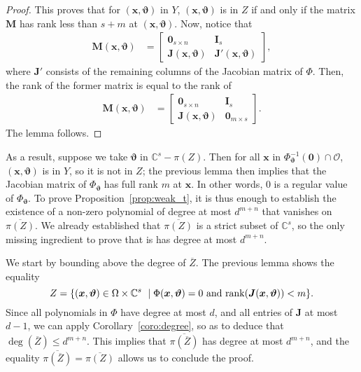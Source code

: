 \documentclass[12pt]{article}
\def\sO{\mathscr{O}}
\def\thetab{\bm{\vartheta}}
\def\xb{{\bm x}}
\def\dt{s}
\def\C{\mathbb{C}}
\def\bbm{\begin{bmatrix}}
\def\ebm{\end{bmatrix}}
\begin{document}
\begin{proof}
  This proves that for $(\xb,\thetab)$ in $Y$, $(\xb,\thetab)$ is in
  $Z$ if and only if the matrix $\bm M$ has rank less than $\dt+m$ at
  $(\xb,\thetab)$. Now, notice that
  \begin{align*}
   \bm M(\xb,\thetab)&= 
    \bbm 
    \textbf{0}_{\dt \times n} &\textbf{I}_{\dt} \\
    \bm J(\xb,\thetab)     &\bm J'(\xb,\thetab)
    \ebm,
  \end{align*}
  where $\bm J'$ consists of the remaining columns of the Jacobian matrix of
  $\Phi$.  Then, the rank of the former matrix is equal to the rank
  of
  \begin{align*}
   \bm M(\xb,\thetab)&= 
    \bbm 
    \textbf{0}_{\dt \times n} &\textbf{I}_{\dt} \\
    \bm J(\xb,\thetab)     & \bm 0_{m \times s}
    \ebm.
  \end{align*}
  The lemma follows.
\end{proof}

As a result, suppose we take $\thetab$ in $\C^\dt - {\pi(Z)}$.  Then
for all $\xb$ in $\Phi_{\thetab}^{-1}(\bm 0) \cap \sO$,
$(\xb,\thetab)$ is in $Y$, so it is not in $Z$; the previous lemma
then implies that the Jacobian matrix of $\Phi_{\thetab}$ has full
rank $m$ at $\xb$. In other words, $0$ is a regular value of
$\Phi_{\thetab}$. To prove Proposition~\ref{prop:weak_t}, it is thus
enough to establish the existence of a non-zero polynomial of degree
at most $d^{m+n}$ that vanishes on $\overline{\pi(Z)}$. We already
established that $\overline{\pi(Z)}$ is a strict subset of $\C^\dt$,
so the only missing ingredient to prove that is has degree
at most $d^{m+n}$.

We start by bounding above the degree of $\overline{Z}$.
The previous lemma shows the equality
\[Z = \{ (\xb,\thetab) \in \Omega \times \C^\dt \ \mid \Phi(\xb,\thetab) =0
\text{~and~} {\rm rank}(\bm J(\xb,\thetab)) < m\}.\] Since all
polynomials in $\Phi$ have degree at most $d$, and all entries of $\bm
J$ at most $d-1$, we can apply Corollary~\ref{coro:degree}, so as to
deduce that $\deg(\overline{Z}) \le d^{m+n}$. This implies 
that $\overline{\pi(\overline Z)}$ has degree at most $d^{m+n}$,
and the equality 
$\overline{\pi(\overline Z)}
=\overline{\pi(Z)}$ allows us to conclude the proof.

\end{document}
